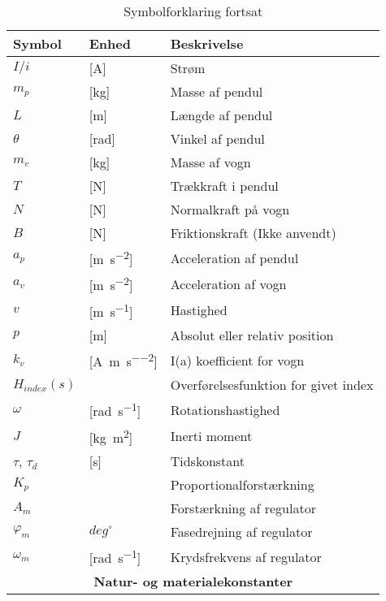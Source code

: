 \begin{table}[h!]
\centering
\caption{Symbolforklaring fortsat}
\label{tab:symboler2}
\begin{threeparttable}
\begin{tabular}{l l l}
\toprule
\multicolumn{1}{l}{Symbol}       &
\multicolumn{1}{l}{Enhed}        &
\multicolumn{1}{l}{Beskrivelse}  \\ 
\midrule
$I/i$				&	[\si{\ampere}]				& Strøm\\
$m_p$					&	[\si{\kilogram}]	 & Masse af pendul  		\\
$L$					&	[\si{\meter}]	 & Længde af pendul 		\\
$\theta$					&	[\si{\radian}]	 & Vinkel af pendul 		\\
$m_v$					&	[\si{\kilogram}]	 & Masse af vogn 		\\
$T$					&	[\si{\newton}]	 & Trækkraft i pendul 		\\
$N$					&	[\si{\newton}]	 & Normalkraft på vogn 		\\
$B$					&	[\si{\newton}]	 & Friktionskraft (Ikke anvendt) 		\\
$a_p$					&	[\si{\meter\per\second\squared}]	 &  Acceleration af pendul		\\
$a_v$					&	[\si{\meter\per\second\squared}]	 &  Acceleration af vogn		\\
$v$					&	[\si{\meter\per\second}]	 &  Hastighed		\\
$p$					&	[\si{\meter}]	 &  Absolut eller relativ position		\\
$k_v$					&	[\si{\ampere\per\meter\per\second\squared}]	 &  I(a) koefficient for vogn 		\\
$H_{index}(s)$					&		 & Overførelsesfunktion for givet index 		\\
$\omega$					&	[\si{\radian\per\second}]	 &  Rotationshastighed		\\
$J$					&	[\si{\kilogram\meter\squared}]	 & Inerti moment  		\\
$\tau$, $\tau_d$					&	[\si{\second}]	 &  Tidskonstant		\\
$K_p$					&		 & Proportionalforstærkning  		\\
$A_m$					&	 &  Forstærkning af regulator		\\
$\varphi_m$					& $deg^{\circ}$	 &  Fasedrejning af regulator		\\
$\omega_m$					&	[\si{\radian\per\second}]	 & Krydsfrekvens af regulator   		\\
\midrule
\multicolumn{3}{c}{\textbf{Natur- og materialekonstanter\tnote{**}}}       \\

\end{tabular}
\end{threeparttable}
\end{table}
